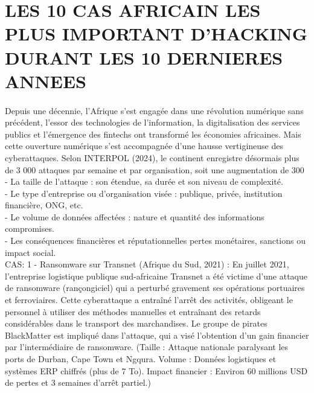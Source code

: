 \documentclass[]{article}
\begin{document}
\section{LES 10 CAS AFRICAIN LES PLUS IMPORTANT D’HACKING DURANT LES 10 DERNIERES ANNEES}
\paragraph{}
Depuis une décennie, l’Afrique s’est engagée dans une révolution numérique sans précédent, l’essor des technologies de l’information, la digitalisation des services publics et l’émergence des fintechs ont transformé les économies africaines. Mais cette ouverture numérique s’est accompagnée d’une hausse vertigineuse des cyberattaques. Selon INTERPOL (2024), le continent enregistre désormais plus de 3 000 attaques par semaine et par organisation, soit une augmentation de 300 %
-	La taille de l’attaque : son étendue, sa durée et son niveau de complexité. \\
-	Le type d’entreprise ou d’organisation visée : publique, privée, institution financière,
ONG, etc. \\
-	Le volume de données affectées :  nature et quantité des informations compromises.\\
-	Les conséquences financières et réputationnelles pertes monétaires, sanctions ou impact social.\\
CAS: 1 - Ransomware sur Transnet (Afrique du Sud, 2021) : En juillet 2021, l'entreprise logistique publique sud-africaine Transnet a été victime d'une attaque de ransomware (rançongiciel) qui a perturbé gravement ses opérations portuaires et ferroviaires. Cette cyberattaque a entraîné l'arrêt des activités, obligeant le personnel à utiliser des méthodes manuelles et entraînant des retards considérables dans le transport des marchandises. Le groupe de pirates BlackMatter est impliqué dans l'attaque, qui a visé l'obtention d'un gain financier par l'intermédiaire de ransomware. (Taille : Attaque nationale paralysant les ports de Durban, Cape Town et Ngqura. Volume : Données logistiques et systèmes ERP chiffrés (plus de 7 To). Impact financier : Environ 60 millions USD de pertes et 3 semaines d’arrêt partiel.)\\
\end{document}
